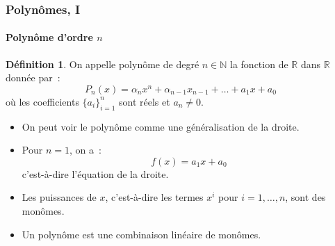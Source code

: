\documentclass[10pt,notheorems]{beamer}
\theoremstyle{plain}
\theoremstyle{definition} %
\newtheorem{definition}{Définition}
\begin{document}
\begin{frame}
  \frametitle{Polynômes, I}
  \framesubtitle{Polynôme d'ordre $n$}
  \hypertarget{slide_polynome_definition}{}

  \bigskip

  \begin{definition}
    On appelle polynôme de degré $n\in\mathbb N$ la fonction de $\mathbb R$ dans $\mathbb R$ donnée par~:
    \[
      P_n(x) = \alpha_n x^n + \alpha_{n-1}x_{n-1}+\ldots+a_1x+a_0
    \]
    où les coefficients $\{a_i\}_{i=1}^n$ sont réels et $a_n\neq 0$.
  \end{definition}

  \bigskip

  \begin{itemize}

  \item On peut voir le polynôme comme une généralisation de la droite.\newline

  \item Pour $n=1$, on a~:
    \[
      f(x) = a_1 x + a_0
    \]
    c'est-à-dire l'équation de la droite.\newline

  \item Les puissances de $x$, c'est-à-dire les termes $x^i$ pour $i=1,\ldots,n$, sont des monômes.\newline

  \item Un polynôme est une combinaison linéaire de monômes.

  \end{itemize}

\end{frame}
\end{document}
